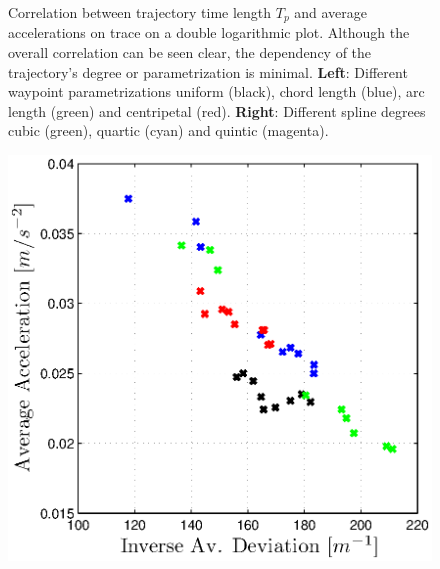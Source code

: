 \begin{figure}[H]
\begin{minipage}[t]{0.48\textwidth}
  \end{minipage}
  \caption{Correlation between trajectory time length $T_p$ and average accelerations on trace on a double logarithmic plot. Although the overall correlation can be seen clear, the dependency of the trajectory's degree or parametrization is minimal. {\bf Left}: Different waypoint parametrizations uniform (black), chord length (blue), arc length (green) and centripetal (red). {\bf Right}: Different spline degrees cubic (green), quartic (cyan) and quintic (magenta).}
  \label{fig:correlation_time_acc}
\end{figure}

\begin{figure}[H]
  \begin{minipage}[t]{0.48\textwidth}
    \includegraphics[width = \textwidth]{correlation/Control_Correlation_InvDev_Acc_Parametrization}
  \end{minipage}
  \hfill
  \begin{minipage}[t]{0.48\textwidth}

\end{minipage}
\end{figure}
